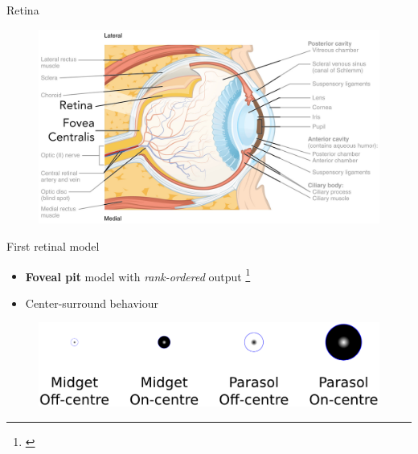 \documentclass[17pt,mathserif]{beamer}
\begin{document}
    \begin{frame}{Retina}
        \vspace*{-4em}
    \begin{figure}
        \includegraphics[width=1.1\textwidth]{eye-anatomy-detail}
        
    \end{figure}
    \end{frame}
    
    \begin{frame}{First retinal model}
        \vspace*{-3em}
        \begin{itemize}
            \item \textbf{Foveal pit} model with \emph{rank-ordered} output \footnote{\cite{basab}}
            \item Center-surround behaviour
        \end{itemize}
        \begin{figure}
          \vspace*{-1.em}
          \includegraphics[scale=0.35]{./retina-model-table}
        \end{figure}
    \end{frame}
    
\end{document}
